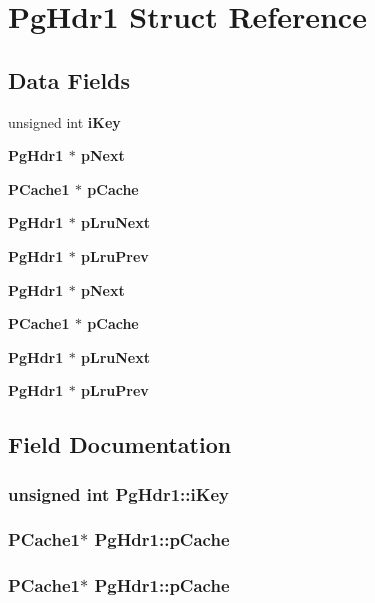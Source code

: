 \section{Pg\-Hdr1 Struct Reference}
\label{structPgHdr1}
\subsection*{Data Fields}
\begin{CompactItemize}
\item 
unsigned int \bf{i\-Key}
\item 
\bf{Pg\-Hdr1} $\ast$ \bf{p\-Next}
\item 
\bf{PCache1} $\ast$ \bf{p\-Cache}
\item 
\bf{Pg\-Hdr1} $\ast$ \bf{p\-Lru\-Next}
\item 
\bf{Pg\-Hdr1} $\ast$ \bf{p\-Lru\-Prev}
\item 
\bf{Pg\-Hdr1} $\ast$ \bf{p\-Next}
\item 
\bf{PCache1} $\ast$ \bf{p\-Cache}
\item 
\bf{Pg\-Hdr1} $\ast$ \bf{p\-Lru\-Next}
\item 
\bf{Pg\-Hdr1} $\ast$ \bf{p\-Lru\-Prev}
\end{CompactItemize}


\subsection{Field Documentation}
\subsubsection{\setlength{\rightskip}{0pt plus 5cm}unsigned int \bf{Pg\-Hdr1::i\-Key}}\label{structPgHdr1_be8e2721b5c936bafb3534a545b7b4a9}


\subsubsection{\setlength{\rightskip}{0pt plus 5cm}\bf{PCache1}$\ast$ \bf{Pg\-Hdr1::p\-Cache}}\label{structPgHdr1_be61faed49a9ae8ffbd6d8c8d290d094}


\subsubsection{\setlength{\rightskip}{0pt plus 5cm}\bf{PCache1}$\ast$ \bf{Pg\-Hdr1::p\-Cache}}\label{structPgHdr1_be61faed49a9ae8ffbd6d8c8d290d094}


